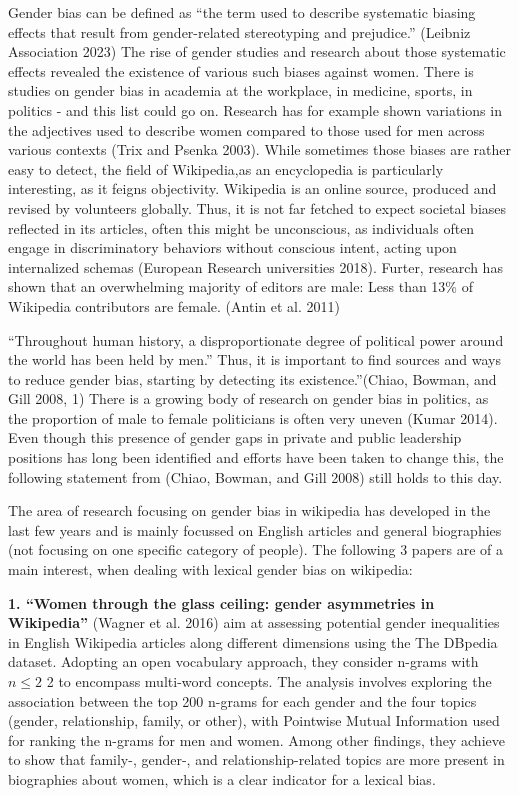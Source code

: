 \documentclass[
]{article}
\begin{document}
Gender bias can be defined as ``the term used to describe systematic
biasing effects that result from gender-related stereotyping and
prejudice.'' (Leibniz Association 2023) The rise of gender studies and
research about those systematic effects revealed the existence of
various such biases against women. There is studies on gender bias in
academia at the workplace, in medicine, sports, in politics - and this
list could go on. Research has for example shown variations in the
adjectives used to describe women compared to those used for men across
various contexts (Trix and Psenka 2003). While sometimes those biases
are rather easy to detect, the field of Wikipedia,as an encyclopedia is
particularly interesting, as it feigns objectivity. Wikipedia is an
online source, produced and revised by volunteers globally. Thus, it is
not far fetched to expect societal biases reflected in its articles,
often this might be unconscious, as individuals often engage in
discriminatory behaviors without conscious intent, acting upon
internalized schemas (European Research universities 2018). Furter,
research has shown that an overwhelming majority of editors are male:
Less than 13\% of Wikipedia contributors are female. (Antin et al. 2011)

``Throughout human history, a disproportionate degree of political power
around the world has been held by men.'' Thus, it is important to find
sources and ways to reduce gender bias, starting by detecting its
existence.''(Chiao, Bowman, and Gill 2008, 1) There is a growing body of
research on gender bias in politics, as the proportion of male to female
politicians is often very uneven (Kumar 2014). Even though this presence
of gender gaps in private and public leadership positions has long been
identified and efforts have been taken to change this, the following
statement from (Chiao, Bowman, and Gill 2008) still holds to this day.

The area of research focusing on gender bias in wikipedia has developed
in the last few years and is mainly focussed on English articles and
general biographies (not focusing on one specific category of people).
The following 3 papers are of a main interest, when dealing with lexical
gender bias on wikipedia:

\textbf{1. ``Women through the glass ceiling: gender asymmetries in
Wikipedia''} (Wagner et al. 2016) aim at assessing potential gender
inequalities in English Wikipedia articles along different dimensions
using the The DBpedia dataset. Adopting an open vocabulary approach,
they consider n-grams with \(n \leq 2\) 2 to encompass multi-word
concepts. The analysis involves exploring the association between the
top 200 n-grams for each gender and the four topics (gender,
relationship, family, or other), with Pointwise Mutual Information used
for ranking the n-grams for men and women. Among other findings, they
achieve to show that family-, gender-, and relationship-related topics
are more present in biographies about women, which is a clear indicator
for a lexical bias.
\end{document}
